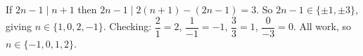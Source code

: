 If $2n-1\mid n+1$ then $2n-1\mid2(n+1)-(2n-1)=3$. So $2n-1\in\{\pm1,\pm3\}$, giving $n\in\{1,0,2,-1\}$. Checking: $\dfrac21=2$, $\dfrac1{-1}=-1$, $\dfrac33=1$, $\dfrac0{-3}=0$. All work, so $n\in\boxed{\{-1,0,1,2\}}$.
